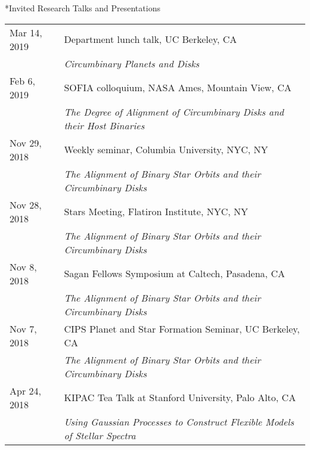 \documentclass[10pt]{article}
\makeatletter
\newcommand{\rowskip}{1.2mm}
\renewcommand{\section}{\@startsection{section}{1}{0pt}{-\baselineskip}{0.5\baselineskip}{\scshape\color{myblue1}}}
\makeatother
\begin{document}
\section*{Invited Research Talks and Presentations}
\begin{tabular*}{\textwidth}{@{\hspace{10pt}}p{1.2in}l}
  Mar 14, 2019 & Department lunch talk, UC Berkeley, CA \\
  & \emph{Circumbinary Planets and Disks} \\[\rowskip]
  Feb 6, 2019 & SOFIA colloquium, NASA Ames, Mountain View, CA \\
  & \emph{The Degree of Alignment of Circumbinary Disks and their Host Binaries} \\[\rowskip]
  Nov 29, 2018 & Weekly seminar, Columbia University, NYC, NY \\
  & \emph{The Alignment of Binary Star Orbits and their Circumbinary Disks} \\[\rowskip]
  Nov 28, 2018 & Stars Meeting, Flatiron Institute, NYC, NY \\
  & \emph{The Alignment of Binary Star Orbits and their Circumbinary Disks} \\[\rowskip]
  Nov 8, 2018 & Sagan Fellows Symposium at Caltech, Pasadena, CA \\
  & \emph{The Alignment of Binary Star Orbits and their Circumbinary Disks} \\[\rowskip]
  Nov 7, 2018 & CIPS Planet and Star Formation Seminar, UC Berkeley, CA  \\
  & \emph{The Alignment of Binary Star Orbits and their Circumbinary Disks} \\[\rowskip]
  Apr 24, 2018 & KIPAC Tea Talk at Stanford University, Palo Alto, CA \\
  & \emph{Using Gaussian Processes to Construct Flexible Models of Stellar Spectra} \\[\rowskip]
\end{tabular*}
\end{document}
